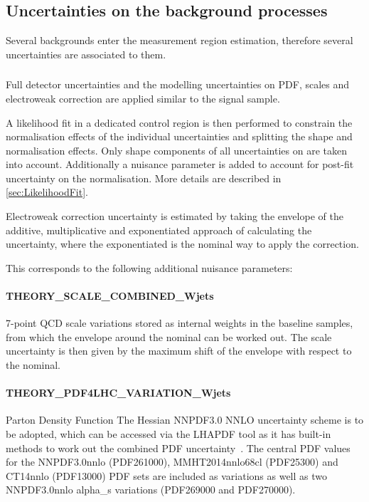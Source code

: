 \subsection{Uncertainties on the background processes}%
\label{sec:systematics:background}

Several backgrounds enter the measurement region estimation, therefore several
uncertainties are associated to them.

\subsubsection{\texorpdfstring{\Wjets}{W+jets}}

Full detector uncertainties and the modelling uncertainties on PDF, scales
and electroweak correction are applied similar to the signal sample.

A likelihood fit in a dedicated control region is then performed to
constrain the normalisation effects of the individual uncertainties
and splitting the shape and normalisation effects.
Only shape components of all uncertainties on \Wjets are taken into account.
Additionally a nuisance parameter is added to account for post-fit uncertainty
on the \Wjets normalisation.
More details are described in \cref{sec:LikelihoodFit}.

Electroweak correction uncertainty is estimated by taking the envelope
of the additive, multiplicative and exponentiated approach of calculating
the uncertainty, where the exponentiated is the nominal way to apply
the correction.

This corresponds to the following additional nuisance parameters:

\paragraph{THEORY\_SCALE\_COMBINED\_Wjets} 7-point QCD scale variations stored as internal weights in the baseline samples, from which the envelope around the nominal can be worked out. The scale uncertainty is then given by the maximum shift of the envelope with respect to the nominal. 

\paragraph{THEORY\_PDF4LHC\_VARIATION\_Wjets} Parton Density Function The Hessian NNPDF3.0 NNLO uncertainty scheme is to be adopted, which can be accessed via the LHAPDF tool as it has built-in methods to work out the combined PDF uncertainty~\cite{Buckley:2014ana}. The central PDF values for the NNPDF3.0nnlo (PDF261000), MMHT2014nnlo68cl (PDF25300) and CT14nnlo (PDF13000) PDF sets are included as variations as well as two NNPDF3.0nnlo alpha\_s variations (PDF269000 and PDF270000).

